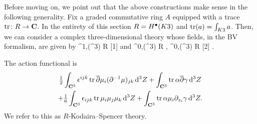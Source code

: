 \documentclass[../main.tex]{subfiles}
\begin{document}
Before moving on, we point out that the above constructions make sense in the following generality.
Fix a graded commutative ring $A$ equipped with a trace $\operatorname{tr} \colon R \to \mathbf{C}$.
In the entirety of this section $R = H^{\bullet}(K3)$ and $\operatorname{tr}(a) = \int_{K3} a$.
Then, we can consider a complex three-dimensional theory whose fields, in the BV formalism, are given by
\beqn
\mu \in \PV^{1,\bu}(\C^3) \otimes R [1]
\eeqn
and 
\beqn
\alpha \in \Omega^{0,\bu}(\C^3) \otimes R , \quad \gamma \in \Omega^{0,\bu}(\C^3) \otimes R [2] .
\eeqn

The action functional is
\begin{multline}\label{eqn:Aaction}
	\tfrac{1}{2}\int_{\mathbf{C}^{3}}   {\epsilon}^{ijk} \operatorname{tr} \overline{\partial} \mu_{i} (\partial^{-1}  \mu)_{jk} \, \mathrm{d}^3 Z + \int_{\mathbf{C}^{3}}  \operatorname{tr} \alpha \overline{\partial} \gamma \, \mathrm{d}^3 Z
	\\
	+ \tfrac{1}{6} \int_{\mathbf{C}^{3}}  {\epsilon}_{ijk} \operatorname{tr} \mu_{i}\mu_{j} \mu_{k} \, \mathrm{d}^3 Z + \int_{\mathbf{C}^{3}} \operatorname{tr}  \alpha \mu_i \partial_{z_i}  \gamma \, \mathrm{d}^3 Z.
\end{multline} 
We refer to this as $R$-Kodaira--Spencer theory.
\end{document}
